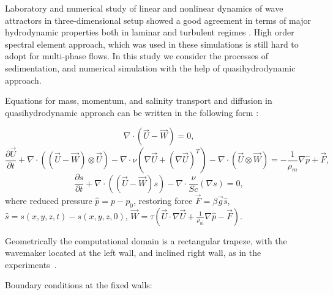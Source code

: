 \documentclass[a4wide,fontsize=12pt]{article}
\begin{document}
Laboratory and numerical study of linear and nonlinear dynamics of wave attractors in three-dimensional setup showed a good agreement in terms of major hydrodynamic properties both in laminar and turbulent regimes \cite{2016BrouzetSibgatullinScolanErmanyukDauxois,2016BrouzetErmanyukJoubaudSibgatullinDauxois}. High order spectral element approach, which was used in these simulations is still hard to adopt for multi-phase flows. In this study we consider the processes of sedimentation, and numerical simulation with the help of quasihydrodynamic  approach\cite{ElizarBook,SherBook}.


Equations for mass, momentum, and salinity transport and diffusion in quasihydrodynamic approach can be written in the following form \cite{ElizarBook}:

 \begin{equation}
     \nabla \cdot \left (\vec U - \vec W \right ) = 0,
     \label{eq:cont}
 \end{equation}
 \begin{equation}
     \frac{\partial \vec U}{\partial t}  + \nabla \cdot \left ( (\vec U - \vec W)\otimes \vec U  \right )
     -
     \nabla \cdot \nu \left ( \nabla \vec U + (\nabla \vec U)^T \right ) - \nabla \cdot \left  (   \vec U \otimes \vec W \right ) 
      = - \frac{1}{\rho_m} \nabla \hat p + \vec F,
      \label{eq:mom}
 \end{equation}
 \begin{equation}
     \frac{\partial s}{\partial t} + \nabla \cdot \left ( (\vec U - \vec W)s \right )
     - \nabla \cdot \frac{\nu}{Sc} \left ( \nabla s \right )=0,
     \label{eq:tr}
 \end{equation}
\noindent
where  
reduced pressure $\hat p = p - p_0$, restoring force $\vec{F}=\beta \vec{g} \hat s$, $\hat s = s(x, y, z, t) - s(x, y, z, 0)$,
$\displaystyle \vec W = \tau \left ( \vec U \cdot \nabla \vec U + \frac{1}{\rho_m} \nabla \hat p - \vec F  \right )$.

Geometrically the computational domain is a rectangular trapeze, with the wavemaker located at the left wall, and inclined right wall, as in the experiments~\cite{2013ScolanErmanyukDauxois,2016BrouzetSibgatullinScolanErmanyukDauxois}.


Boundary conditions at the fixed walls:
\end{document}
